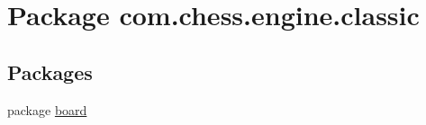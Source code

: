 \hypertarget{namespacecom_1_1chess_1_1engine_1_1classic}{}\section{Package com.\+chess.\+engine.\+classic}
\label{namespacecom_1_1chess_1_1engine_1_1classic}
\subsection*{Packages}
\begin{DoxyCompactItemize}
\item 
package \mbox{\hyperlink{namespacecom_1_1chess_1_1engine_1_1classic_1_1board}{board}}
\end{DoxyCompactItemize}
